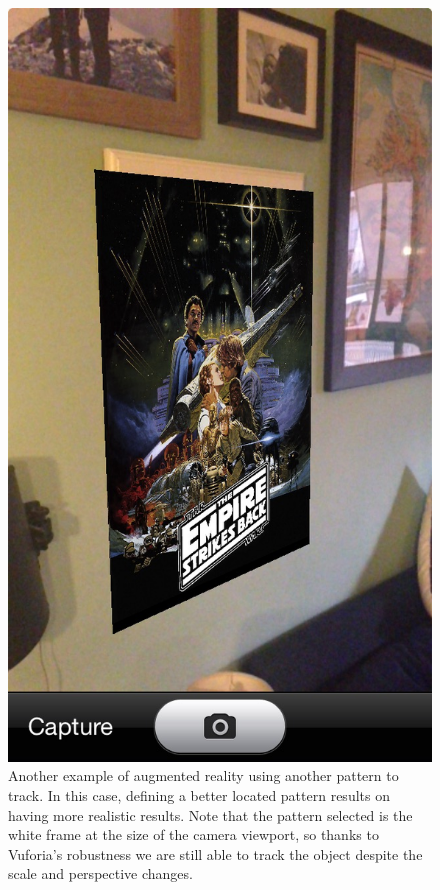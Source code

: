 \begin{figure}
\centering
\includegraphics[scale=0.45]{img/track02.JPG}
\caption{\label{fig:track02} Another example of augmented reality using another
  pattern to track. In this case, defining a better located pattern results on
  having more realistic results. Note that the pattern selected is the white frame at the size
of the camera viewport, so thanks to Vuforia's robustness we are still able to track
the object despite the scale and perspective changes.}
\end{figure} 

